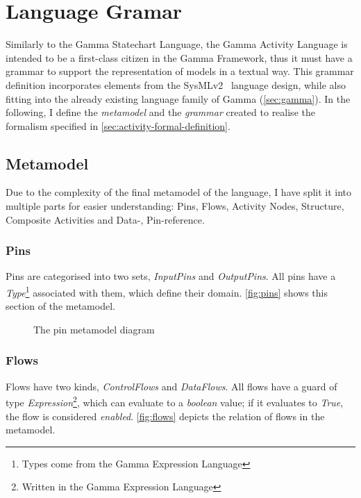 \clearpage\section{Language Gramar}\label{sec:activity-grammar}

Similarly to the Gamma Statechart Language, the Gamma Activity Language is intended to be a first-class citizen in the Gamma Framework, thus it must have a grammar to support the representation of models in a textual way. This grammar definition incorporates elements from the SysMLv2~\cite{omg_sysml_v2} language design, while also fitting into the already existing language family of Gamma (\autoref{sec:gamma}). In the following, I define the \emph{metamodel} and the \emph{grammar} created to realise the formalism specified in \autoref{sec:activity-formal-definition}.

\subsection{Metamodel}

Due to the complexity of the final metamodel of the language, I have split it into multiple parts for easier understanding: Pins, Flows, Activity Nodes, Structure, Composite Activities and Data-, Pin-reference.

\subsubsection*{Pins}

Pins are categorised into two sets, \emph{InputPins} and \emph{OutputPins}. All pins have a \emph{Type}\footnote{Types come from the Gamma Expression Language} associated with them, which define their domain. \autoref{fig:pins} shows this section of the metamodel.

\begin{figure}[!ht]
	\centering
	
	\caption{The pin metamodel diagram}
	\label{fig:pins}
\end{figure}

\subsubsection*{Flows}

Flows have two kinds, \emph{ControlFlows} and \emph{DataFlows}. All flows have a guard of type \emph{Expression}\footnote{Written in the Gamma Expression Language}, which can evaluate to a \emph{boolean} value; if it evaluates to \emph{True}, the flow is considered \emph{enabled}. \autoref{fig:flows} depicts the relation of flows in the metamodel.

